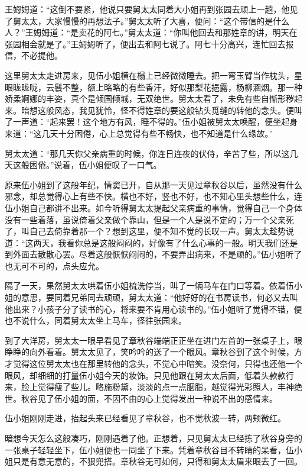 \documentclass[12pt,UTF8]{ctexbook}
\begin{document}
{{{王姆姆道：“这倒不要紧，他说只要舅太太同着大小姐再到张园去顽上一趟，他见了舅太太，大家慢慢的再想法子。”舅太太听了大喜，便问：“这个带信的是什么人？”王姆姆道：“是卖花的阿七。”舅太太道：“你叫他回去和那姓章的讲，明天在张园相会就是了。”王姆姆听了，便出去和阿七说了。阿七十分高兴，连忙回去报信，不必提他。

这里舅太太走进房来，见伍小姐横在榻上已经微微睡去。把一弯玉臂当作枕头，星眼眬眬咙，云鬟不整，额上略略的有些香汗，好似那梨花挹露，杨柳涵烟。那一种娇柔婀娜的丰姿，真个是倾国倾城，无双绝世。舅太太看了，未免有些自惭形秽起来。暗想这般风态，我见犹怜，怪不得姓章的要这般钻头觅缝的转他的念头。便叫了一声道：“起来罢！这个地方有风，睡不得的。”伍小姐被舅太太唤醒，便坐起身来道：“这几天十分困倦，心上总觉得有些不畅快，也不知道是什么缘故。”

舅太太道：“那几天你父亲病重的时候，你连日连夜的伏侍，辛苦了些，所以这几天这般困倦。”说着，伍小姐便叹了一口气。

原来伍小姐到了这般年纪，情窦已开，自从那一天见过章秋谷以后，虽然没有什么邪念，却总觉得心上有些不快。横也不好，竖也不好，也不知心里头想些什么，连伍小姐自己都讲不出来。如今听得舅太太提起父亲病重的事情，觉得自己一个身体没有一些着落，虽说倚着父亲做个靠山，但是一个人是说不定的；万一个父亲死了，叫自己去倚靠着那一个？想到这里，便不知不觉的长叹一声。舅太太趁势说道：“这两天，我看你总是这般闷闷的，好像有了什么心事的一般。明天我们还是到外面去散散心罢。尽着这般恹恹闷闷的，不要弄出病来，不是顽的。”伍小姐听了也无可不可的，点头应允。

隔了一天，果然舅太太哄着伍小姐梳洗停当，叫了一辆马车在门口等着。依着伍小姐的意思，要同着兄弟同去顽顽，舅太太道：“他好好的在书房读书，何必又去叫他出来？小孩子分了读书的心，将来要不肯用心读书的。”伍小姐听了觉得不错，便也不说什么，同着舅太太坐上马车，径往张园来。

到了大洋房，舅太太一眼早看见了章秋谷端端正正坐在进门左首的一张桌子上，眼睁睁的向外看着。舅太太见了，笑吟吟的送了一个眼风。章秋谷到了这个时候，方才觉得这位舅太太也在那里转他的念头，不觉心中暗笑。没奈何，只得也还他一个眼风，却细细的打量伍小姐今天的妆饰。只见他跟在舅太太后面，低着头款款行来，脸上觉得瘦了些儿。略施粉黛，淡淡的点一点胭脂，越觉得光彩照人，丰神绝世。秋谷见了伍小姐的面，不因不由的心上觉得发出一种说不出的感情来。

伍小姐刚刚走进，抬起头来已经看见了章秋谷，也不觉秋波一转，两颊微红。

暗想今天怎么这般凑巧，刚刚遇着了他。正想着，只见舅太太已经拣了秋谷身旁的一张桌子轻轻坐下，伍小姐便也一同坐了下来。凭着章秋谷目不转睛的呆看，伍小姐只是有意无意的，不狠兜搭。章秋谷无可如何，只得和舅太太眉来眼去了一回。

}}}
\end{document}
